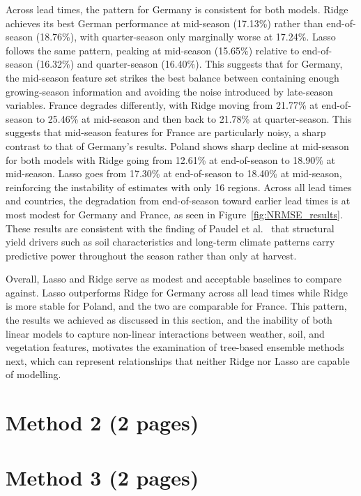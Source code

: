 \documentclass[pdflatex,sn-mathphys-num, oneside]{sn-jnl}%
\theoremstyle{thmstyleone}%
\theoremstyle{thmstyletwo}%
\theoremstyle{thmstylethree}%
\begin{document}
Across lead times, the pattern for Germany is consistent for both models. Ridge achieves its best German performance at mid-season (17.13\%) rather than end-of-season (18.76\%), with quarter-season only marginally worse at 17.24\%. Lasso follows the same pattern, peaking at mid-season (15.65\%) relative to end-of-season (16.32\%) and quarter-season (16.40\%). This suggests that for Germany, the mid-season feature set strikes the best balance between containing enough growing-season information and avoiding the noise introduced by late-season variables. France degrades differently, with Ridge moving from 21.77\% at end-of-season to 25.46\% at mid-season and then back to 21.78\% at quarter-season. This suggests that mid-season features for France are particularly noisy, a sharp contrast to that of Germany's results. Poland shows sharp decline at mid-season for both models with Ridge going from 12.61\% at end-of-season to 18.90\% at mid-season. Lasso goes from 17.30\% at end-of-season to 18.40\% at mid-season, reinforcing the instability of estimates with only 16 regions. Across all lead times and countries, the degradation from end-of-season toward earlier lead times is at most modest for Germany and France, as seen in Figure~\ref{fig:NRMSE_results}. These results are consistent with the finding of Paudel et al.~\cite{bib16} that structural yield drivers such as soil characteristics and long-term climate patterns carry predictive power throughout the season rather than only at harvest. 

Overall, Lasso and Ridge serve as modest and acceptable baselines to compare against. Lasso outperforms Ridge for Germany across all lead times while Ridge is more stable for Poland, and the two are comparable for France. This pattern, the results we achieved as discussed in this section, and the inability of both linear models to capture non-linear interactions between weather, soil, and vegetation features, motivates the examination of tree-based ensemble methods next, which can represent relationships that neither Ridge nor Lasso are capable of modelling.
\clearpage

\section{Method 2 (2 pages)}\label{sec3}

\clearpage

\section{Method 3 (2 pages)}\label{sec3}
\end{document}
